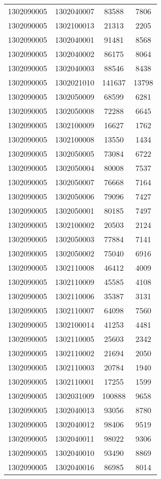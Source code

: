 \begin{longtable}{llcc}
1302090005 & 1302040007 & 83588 & 7806\\
1302090005 & 1302100013 & 21313 & 2205\\
1302090005 & 1302040001 & 91481 & 8568\\
1302090005 & 1302040002 & 86175 & 8064\\
1302090005 & 1302040003 & 88546 & 8438\\
1302090005 & 1302021010 & 141637 & 13798\\
1302090005 & 1302050009 & 68599 & 6281\\
1302090005 & 1302050008 & 72288 & 6645\\
1302090005 & 1302100009 & 16627 & 1762\\
1302090005 & 1302100008 & 13550 & 1434\\
1302090005 & 1302050005 & 73084 & 6722\\
1302090005 & 1302050004 & 80008 & 7537\\
1302090005 & 1302050007 & 76668 & 7164\\
1302090005 & 1302050006 & 79096 & 7427\\
1302090005 & 1302050001 & 80185 & 7497\\
1302090005 & 1302100002 & 20503 & 2124\\
1302090005 & 1302050003 & 77884 & 7141\\
1302090005 & 1302050002 & 75040 & 6916\\
1302090005 & 1302110008 & 46412 & 4009\\
1302090005 & 1302110009 & 45585 & 4108\\
1302090005 & 1302110006 & 35387 & 3131\\
1302090005 & 1302110007 & 64098 & 7560\\
1302090005 & 1302100014 & 41253 & 4481\\
1302090005 & 1302110005 & 25603 & 2342\\
1302090005 & 1302110002 & 21694 & 2050\\
1302090005 & 1302110003 & 20784 & 1940\\
1302090005 & 1302110001 & 17255 & 1599\\
1302090005 & 1302031009 & 100888 & 9658\\
1302090005 & 1302040013 & 93056 & 8780\\
1302090005 & 1302040012 & 98406 & 9519\\
1302090005 & 1302040011 & 98022 & 9306\\
1302090005 & 1302040010 & 93490 & 8869\\
1302090005 & 1302040016 & 86985 & 8014\\

\end{longtable}
